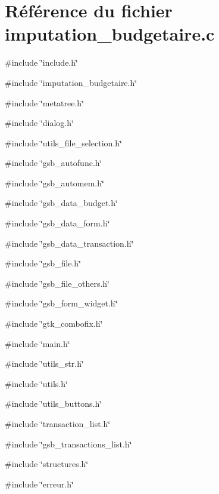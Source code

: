 \section{Référence du fichier imputation\_\-budgetaire.c}
\label{imputation__budgetaire_8c}
{\ttfamily \#include \char`\"{}include.h\char`\"{}}\par
{\ttfamily \#include \char`\"{}imputation\_\-budgetaire.h\char`\"{}}\par
{\ttfamily \#include \char`\"{}metatree.h\char`\"{}}\par
{\ttfamily \#include \char`\"{}dialog.h\char`\"{}}\par
{\ttfamily \#include \char`\"{}utils\_\-file\_\-selection.h\char`\"{}}\par
{\ttfamily \#include \char`\"{}gsb\_\-autofunc.h\char`\"{}}\par
{\ttfamily \#include \char`\"{}gsb\_\-automem.h\char`\"{}}\par
{\ttfamily \#include \char`\"{}gsb\_\-data\_\-budget.h\char`\"{}}\par
{\ttfamily \#include \char`\"{}gsb\_\-data\_\-form.h\char`\"{}}\par
{\ttfamily \#include \char`\"{}gsb\_\-data\_\-transaction.h\char`\"{}}\par
{\ttfamily \#include \char`\"{}gsb\_\-file.h\char`\"{}}\par
{\ttfamily \#include \char`\"{}gsb\_\-file\_\-others.h\char`\"{}}\par
{\ttfamily \#include \char`\"{}gsb\_\-form\_\-widget.h\char`\"{}}\par
{\ttfamily \#include \char`\"{}gtk\_\-combofix.h\char`\"{}}\par
{\ttfamily \#include \char`\"{}main.h\char`\"{}}\par
{\ttfamily \#include \char`\"{}utils\_\-str.h\char`\"{}}\par
{\ttfamily \#include \char`\"{}utils.h\char`\"{}}\par
{\ttfamily \#include \char`\"{}utils\_\-buttons.h\char`\"{}}\par
{\ttfamily \#include \char`\"{}transaction\_\-list.h\char`\"{}}\par
{\ttfamily \#include \char`\"{}gsb\_\-transactions\_\-list.h\char`\"{}}\par
{\ttfamily \#include \char`\"{}structures.h\char`\"{}}\par
{\ttfamily \#include \char`\"{}erreur.h\char`\"{}}\par
